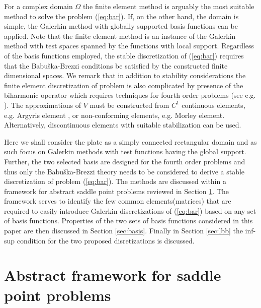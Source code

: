 \documentclass{marine_2015}
\begin{document}
For a complex domain $\Omega$ the finite element method is arguably the most 
suitable method to solve the problem (\ref{eq:bar}). If, on the other hand, the
domain is simple, the Galerkin method with globally supported basis functions
can be applied. Note that the finite element method is an instance of the Galerkin 
method with test spaces spanned by the functions with local support. Regardless
of the basis functions employed, the stable discretization of (\ref{eq:bar})
requires that the Babu\v{s}ka-Brezzi conditions be satisfied by the constructed
finite dimensional spaces. We remark that in addition to stability
considerations the finite element discretization of problem is also complicated
by presence of the biharmonic operator which requires techniques for fourth order 
problems (see e.g. \cite{brenner}). The approximations of $V$ must be constructed 
from $C^1$ continuous elements, e.g. Argyris element \cite{argyris}, or non-conforming 
elements, e.g. Morley element\cite{morley}. Alternatively, discontinuous elements with 
suitable stabilization \cite{brenner_ip} can be used. 

Here we shall consider the plate as a simply connected rectangular domain and as
such focus on Galerkin methods with test functions having the global support.
Further, the two selected basis are designed for the fourth order problems and thus 
only the Babu\v{s}ka-Brezzi theory needs to be considered to derive a stable
discretization of problem (\ref{eq:bar}). The methods are discussed within a
framework for abstract saddle point problems reviewed in Section
\ref{sec:abstract}. The framework serves to identify the few common
elements(matrices) that are required to easily introduce Galerkin discretizations of
(\ref{eq:bar}) based on any set of basis functions. Properties of the two sets of
basis functions considered in this paper are then discussed in Section \ref{sec:basis}.
Finally in Section \ref{sec:lbb} the inf-sup condition for the two proposed
disretizations is discussed.

\section{Abstract framework for saddle point problems}
\label{sec:abstract}
\end{document}
